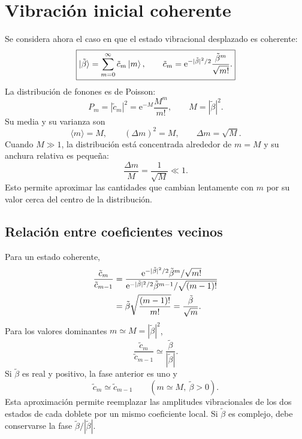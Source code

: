 \documentclass[11pt]{article}
\newcommand{\ee}{\mathrm{e}}
\begin{document}
\section{Vibraci\'on inicial coherente}

Se considera ahora el caso en que el estado vibracional desplazado es
coherente:
\begin{equation}
  \boxed{
  \ket{\tilde\beta}
  =
  \sum_{m=0}^{\infty}
  \tilde c_m\ket m,
  \qquad
  \tilde c_m
  =
  \ee^{-|\tilde\beta|^2/2}
  \frac{\tilde\beta^m}{\sqrt{m!}}.
  }
\end{equation}
La distribuci\'on de fonones es de Poisson:
\begin{equation}
  P_m
  =
  |\tilde c_m|^2
  =
  \ee^{-M}\frac{M^m}{m!},
  \qquad
  \boxed{M=|\tilde\beta|^2}.
\end{equation}
Su media y su varianza son
\begin{equation}
  \langle m\rangle=M,
  \qquad
  (\Delta m)^2=M,
  \qquad
  \Delta m=\sqrt M.
\end{equation}
Cuando $M\gg1$, la distribuci\'on est\'a concentrada alrededor de $m=M$ y su
anchura relativa es peque\~na:
\begin{equation}
  \frac{\Delta m}{M}
  =
  \frac{1}{\sqrt M}
  \ll1.
\end{equation}
Esto permite aproximar las cantidades que cambian lentamente con $m$ por su
valor cerca del centro de la distribuci\'on.

\subsection{Relaci\'on entre coeficientes vecinos}

Para un estado coherente,
\begin{align}
  \frac{\tilde c_m}{\tilde c_{m-1}}
  &=
  \frac{
  \ee^{-|\tilde\beta|^2/2}
  \tilde\beta^m/\sqrt{m!}
  }{
  \ee^{-|\tilde\beta|^2/2}
  \tilde\beta^{m-1}/\sqrt{(m-1)!}
  }
  \notag\\
  &=
  \tilde\beta
  \sqrt{\frac{(m-1)!}{m!}}
  =
  \frac{\tilde\beta}{\sqrt m}.
\end{align}
Para los valores dominantes $m\simeq M=|\tilde\beta|^2$,
\begin{equation}
  \frac{\tilde c_m}{\tilde c_{m-1}}
  \simeq
  \frac{\tilde\beta}{|\tilde\beta|}.
\end{equation}
Si $\tilde\beta$ es real y positivo, la fase anterior es uno y
\begin{equation}
  \boxed{
  \tilde c_m\simeq\tilde c_{m-1}
  \qquad
  (m\simeq M,\ \tilde\beta>0).
  }
\end{equation}
Esta aproximaci\'on permite reemplazar las amplitudes vibracionales de los dos
estados de cada doblete por un mismo coeficiente local. Si $\tilde\beta$ es
complejo, debe conservarse la fase
$\tilde\beta/|\tilde\beta|$.
\end{document}
